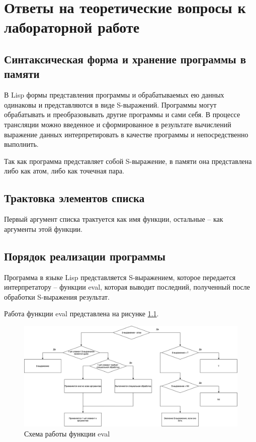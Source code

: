\documentclass[a4paper,14pt, unknownkeysallowed]{extreport}
\begin{document}
\chapter{Ответы на теоретические вопросы к лабораторной работе}

\section{Синтаксическая форма и хранение программы в памяти}

В Lisp формы представления программы и обрабатываемых ею данных одинаковы и представляются в виде S-выражений. Программы могут обрабатывать и преобразовывать другие программы и сами себя. В процессе трансляции можно введенное и сформированное в результате вычислений выражение данных интерпретировать в качестве программы и непосредственно выполнить. 

Так как программа представляет собой S-выражение, в памяти она представлена либо как атом, либо как точечная пара.

\section{Трактовка элементов списка}

Первый аргумент списка трактуется как имя функции, остальные -- как аргументы этой функции.

\section{Порядок реализации программы}

Программа в языке Lisp представляется S-выражением, которое передается интерпретатору -- функции eval, которая выводит последний, полученный после обработки S-выражения результат. 

Работа функции eval представлена на рисунке \ref{fig:diagram}.

\clearpage
\begin{figure}[h]
	\centering
	\includegraphics[scale=0.35]{img/diagram.png}
	\caption{Схема работы функции eval}
	\label{fig:diagram}
\end{figure} 
\end{document}
